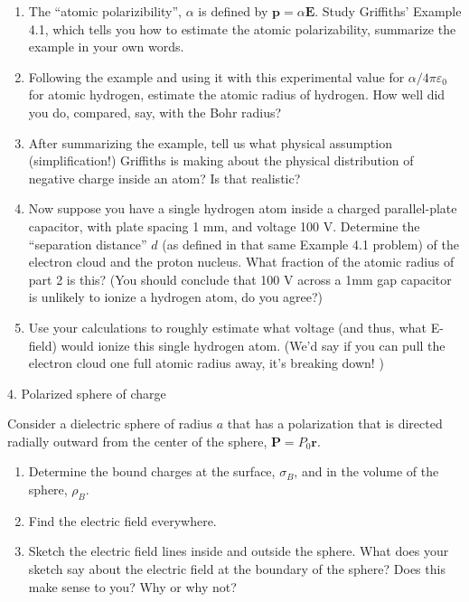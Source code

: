 \documentclass[11pt]{article}
\def\tightlist{}
\begin{document}
\begin{enumerate}
\def\labelenumi{\arabic{enumi}.}
\tightlist
\item
  The ``atomic polarizibility'', \(\alpha\) is defined by
  \(\mathbf{p}=\alpha\mathbf{E}\). Study Griffiths' Example 4.1, which
  tells you how to estimate the atomic polarizability, summarize the
  example in your own words.
\item
  Following the example and using it with this experimental value for
  \(\alpha/4\pi\varepsilon_0\) for atomic hydrogen, estimate the atomic
  radius of hydrogen. How well did you do, compared, say, with the Bohr
  radius?
\item
  After summarizing the example, tell us what physical assumption
  (simplification!) Griffiths is making about the physical distribution
  of negative charge inside an atom? Is that realistic?
\item
  Now suppose you have a single hydrogen atom inside a charged
  parallel-plate capacitor, with plate spacing 1 mm, and voltage 100 V.
  Determine the ``separation distance'' \(d\) (as defined in that same
  Example 4.1 problem) of the electron cloud and the proton nucleus.
  What fraction of the atomic radius of part 2 is this? (You should
  conclude that 100 V across a 1mm gap capacitor is unlikely to ionize a
  hydrogen atom, do you agree?)
\item
  Use your calculations to roughly estimate what voltage (and thus, what
  E-field) would ionize this single hydrogen atom. (We'd say if you can
  pull the electron cloud one full atomic radius away, it's breaking
  down! )
\end{enumerate}

{\Large 4. Polarized sphere of
charge}\label{polarized-sphere-of-charge}

Consider a dielectric sphere of radius \(a\) that has a polarization
that is directed radially outward from the center of the sphere,
\(\mathbf{P} = P_0\mathbf{r}\).

\begin{enumerate}
\def\labelenumi{\arabic{enumi}.}
\tightlist
\item
  Determine the bound charges at the surface, \(\sigma_B\), and in the
  volume of the sphere, \(\rho_B\).
\item
  Find the electric field everywhere.
\item
  Sketch the electric field lines inside and outside the sphere. What
  does your sketch say about the electric field at the boundary of the
  sphere? Does this make sense to you? Why or why not?
\end{enumerate}
\end{document}
